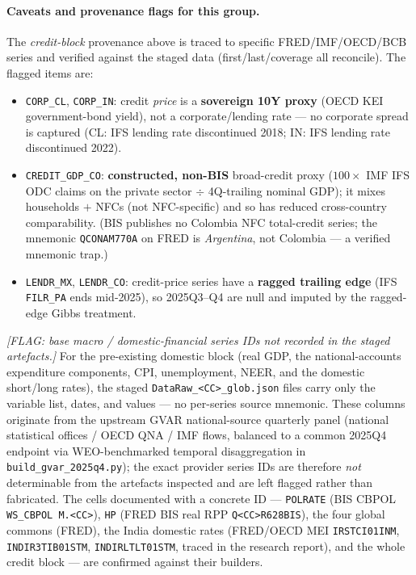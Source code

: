 \paragraph{Caveats and provenance flags for this group.}
The \emph{credit-block} provenance above is traced to specific FRED/IMF/OECD/BCB
series and verified against the staged data (first/last/coverage all reconcile).
The flagged items are:
\begin{itemize}\setlength\itemsep{1pt}
  \item \texttt{CORP\_CL}, \texttt{CORP\_IN}: credit \emph{price} is a
    \textbf{sovereign 10Y proxy} (OECD KEI government-bond yield), not a
    corporate/lending rate --- no corporate spread is captured (CL: IFS lending
    rate discontinued 2018; IN: IFS lending rate discontinued 2022).
  \item \texttt{CREDIT\_GDP\_CO}: \textbf{constructed, non-BIS} broad-credit
    proxy ($100\times$ IMF IFS ODC claims on the private sector $\div$
    4Q-trailing nominal GDP); it mixes households $+$ NFCs (not NFC-specific)
    and so has reduced cross-country comparability. (BIS publishes no Colombia
    NFC total-credit series; the mnemonic \texttt{QCONAM770A} on FRED is
    \emph{Argentina}, not Colombia --- a verified mnemonic trap.)
  \item \texttt{LENDR\_MX}, \texttt{LENDR\_CO}: credit-price series have a
    \textbf{ragged trailing edge} (IFS \texttt{FILR\_PA} ends mid-2025), so
    2025Q3--Q4 are null and imputed by the ragged-edge Gibbs treatment.
\end{itemize}
\textit{[FLAG: base macro / domestic-financial series IDs not recorded in the
staged artefacts.]} For the pre-existing domestic block (real GDP, the
national-accounts expenditure components, CPI, unemployment, NEER, and the
domestic short/long rates), the staged \texttt{DataRaw\_<CC>\_glob.json} files
carry only the variable list, dates, and values --- no per-series source
mnemonic. These columns originate from the upstream GVAR national-source
quarterly panel (national statistical offices / OECD QNA / IMF flows, balanced
to a common 2025Q4 endpoint via WEO-benchmarked temporal disaggregation in
\texttt{build\_gvar\_2025q4.py}); the exact provider series IDs are therefore
\emph{not} determinable from the artefacts inspected and are left flagged rather
than fabricated. The cells documented with a concrete ID --- \texttt{POLRATE}
(BIS CBPOL \texttt{WS\_CBPOL M.<CC>}), \texttt{HP} (FRED BIS real RPP
\texttt{Q<CC>R628BIS}), the four global commons (FRED), the India domestic
rates (FRED/OECD MEI \texttt{IRSTCI01INM}, \texttt{INDIR3TIB01STM},
\texttt{INDIRLTLT01STM}, traced in the research report), and the whole credit
block --- are confirmed against their builders.

